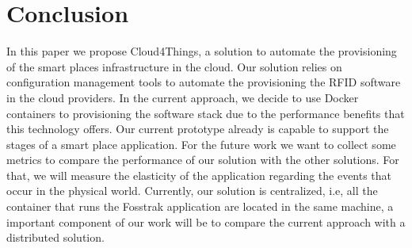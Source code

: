 \section{Conclusion}
\label{sec:conclusion}
In this paper we propose Cloud4Things, a solution to automate the provisioning of the smart places
infrastructure in the cloud. Our solution relies on configuration management tools to automate the
provisioning the RFID software in the cloud providers. In the current approach, we decide to use
Docker containers to provisioning the software stack due to the performance benefits that this
technology offers. Our current prototype already is capable to support the stages of a smart place
application. For the future work we want to collect some metrics to compare the performance of our solution
with the other solutions. For that, we will measure the elasticity of the application regarding the
events that occur in the physical world. Currently, our solution is centralized, i.e, all the container
that runs the Fosstrak application are located in the same machine, a important component of our
work will be to compare the current approach with a distributed solution.
